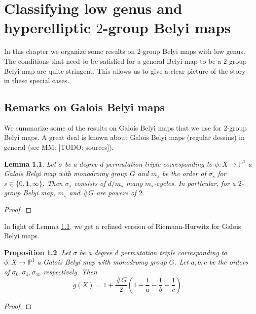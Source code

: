 \documentclass{dcthesis}
\newcommand{\PP}{\mathbb P}
\newcommand{\mm}[1]{{\color{blue} \sf MM: [#1]}}
\newtheorem{prop}{Proposition}[section]
\newtheorem{lemma}[prop]{Lemma}
\theoremstyle{definition}
\theoremstyle{remark}
\numberwithin{equation}{section}
\numberwithin{figure}{section}
\begin{document}
\chapter{Classifying low genus and hyperelliptic $2$-group Belyi maps}{\label{chapter:classify}
  In this chapter we organize some results on $2$-group Belyi maps
  with low genus.
  The conditions that need to be satisfied for a general Belyi map
  to be a $2$-group Belyi map are quite stringent.
  This allows us to give a clear picture of the story
  in these special cases.
  \section{Remarks on Galois Belyi maps}{\label{sec:galoisbelyimaps}
    We summarize some of the results on Galois Belyi maps
    that we use for $2$-group Belyi maps.
    A great deal is known about Galois Belyi maps (regular dessins) in general
    (see \mm{TODO: sources}).
    \begin{lemma}\label{lem:regular}
      Let $\sigma$ be a degree $d$ permutation triple corresponding to
      $\phi\colon X\to\PP^1$ a Galois Belyi map with monodromy group $G$
      and
      $m_s$ be the order of $\sigma_s$ for $s\in\{0,1,\infty\}$.
      Then $\sigma_s$ consists of $d/m_s$ many $m_s$-cycles.
      In particular,
      for a $2$-group Belyi map,
      $m_s$ and $\#G$ are powers of $2$.
    \end{lemma}
    \begin{proof}
    \end{proof}
    In light of Lemma \ref{lem:regular},
    we get a refined version of Riemann-Hurwitz for Galois Belyi maps.
    \begin{prop}\label{prop:riemannhurwitzgalois}
      Let $\sigma$ be a degree $d$ permutation triple corresponding to
      $\phi\colon X\to\PP^1$ a Galois Belyi map with monodromy group $G$.
      Let $a,b,c$ be the orders of $\sigma_0,\sigma_1,\sigma_\infty$
      respectively.
      Then
      \begin{equation}\label{eqn:riemannhurwitzgalois}
        g(X) = 1+\frac{\#G}{2}\left(1-\frac{1}{a}-\frac{1}{b}-\frac{1}{c}\right).
      \end{equation}
    \end{prop}
    \begin{proof}
    \end{proof}
  }
}
\end{document}
